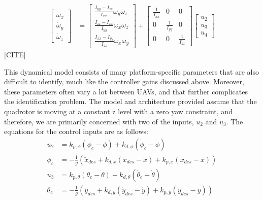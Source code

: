 \documentclass[letterpaper, 10 pt, conference]{ieeeconf}  %
\begin{document}
\begin{equation}
\begin{aligned}
	\begin{bmatrix}\dot{\omega}_{x} \\ \dot{\omega}_{y} \\ \dot{\omega}_{z}\end{bmatrix} &= \begin{bmatrix}\frac{I_{yy} - I_{zz}}{I_{xx}} \omega_{y}\omega_{z}\\ \frac{I_{zz} - I_{xx}}{I_{yy}} \omega_{x}\omega_{z} \\ \frac{I_{xx} - I_{yy}}{I_{zz}} \omega_{x}\omega_{y} \end{bmatrix} +  \begin{bmatrix}\frac{1}{I_{xx}} & 0 & 0\\ 0 & \frac{1}{I_{yy}} & 0\\ 0 & 0 & \frac{1}{I_{zz}}\end{bmatrix} \begin{bmatrix}u_{2} \\ u_{3} \\ u_{4} \end{bmatrix}
	\end{aligned}
	\label{eq:quadrotor_dynamics} \nonumber
\end{equation} [CITE]

This dynamical model consists of many platform-specific parameters that are also difficult to identify, much like the controller gains discussed above. Moreover, these parameters often vary a lot between UAVs, and that further complicates the identification problem. The model and architecture provided assume that the quadrotor is moving at a constant z level with a zero yaw constraint, and therefore, we are primarily concerned with two of the inputs, $u_2$ and $u_3$. The equations for the control inputs are as follows:
\begin{align} \label{eq:cinputs}
    u_2 &= k_{p,\phi}(\phi_c-\phi) + k_{d,\phi}(\dot{\phi}_c - \dot{\phi}) \nonumber \\
    \phi_c &= -\frac{1}{g}(\ddot{x}_{des} + k_{d,x}(\dot{x}_{des}-\dot{x}) + k_{p,x}(x_{des}-x)) \nonumber \\
    u_3 &= k_{p,\theta}(\theta_c-\theta) + k_{d,\theta}(\dot{\theta}_c - \dot{\theta}) \nonumber \\
    \theta_c &= -\frac{1}{g}(\ddot{y}_{des} + k_{d,y}(\dot{y}_{des}-\dot{y}) + k_{p,y}(y_{des}-y))
\end{align}
\end{document}
